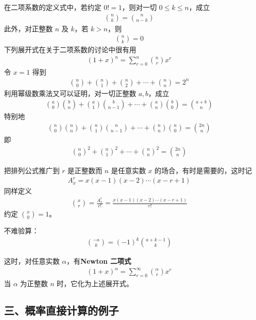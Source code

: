 \documentclass[../../main.tex]{subfiles}
\begin{document}
在二项系数的定义式中，若约定 $0!=1$，则对一切 $0\leqslant k\leqslant n$，成立
\begin{align*}
\binom{n}{k}=\binom{n}{n-k}
\end{align*}
此外，对正整数 $n$ 及 $k$，若 $k>n$，则
\begin{align*}
\binom{n}{k}=0
\end{align*}
下列展开式在关于二项系数的讨论中很有用
\begin{align*}
(1+x)^n=\sum_{r=0}^{n}\binom{n}{r}x^r
\end{align*}
令 $x=1$ 得到
\begin{align*}
\binom{n}{0}+\binom{n}{1}+\binom{n}{2}+\cdots+\binom{n}{n}=2^n
\end{align*}
利用幂级数乘法又可以证明，对一切正整数 $a,b$，成立
\begin{align}
\binom{a}{0}\binom{b}{n}+\binom{a}{1}\binom{b}{n-1}+\cdots+\binom{a}{n}\binom{b}{0}=\binom{a+b}{n}\label{align:ch01-范德蒙德}
\end{align}
特别地
\begin{align*}
\binom{n}{0}\binom{n}{n}+\binom{n}{1}\binom{n}{n-1}+\cdots+\binom{n}{n}\binom{n}{0}=\binom{2n}{n}
\end{align*}
即
\begin{align}
\binom{n}{0}^2+\binom{n}{1}^2+\cdots+\binom{n}{n}^2=\binom{2n}{n}\label{align:ch01-二项系数平方和}
\end{align}

把排列公式推广到 $r$ 是正整数而 $n$ 是任意实数 $x$ 的场合，有时是需要的，这时记
\begin{align*}
A_x^r=x(x-1)(x-2)\cdots(x-r+1)
\end{align*}
同样定义
\begin{align*}
\binom{x}{r}=\frac{A_x^r}{r!}=\frac{x(x-1)(x-2)\cdots(x-r+1)}{r!}
\end{align*}
约定 $\binom{x}{0}=1$。

不难验算：
\begin{align}
\binom{-a}{k}=(-1)^k\binom{a+k-1}{k}\label{align:ch01-负二项系数}
\end{align}

这时，对任意实数 $\alpha$，有\textbf{Newton 二项式}
\begin{align*}
(1+x)^\alpha=\sum_{r=0}^{\infty}\binom{\alpha}{r}x^r
\end{align*}
当 $\alpha$ 为正整数 $n$ 时，它化为上述展开式。

\subsection*{三、概率直接计算的例子}
\end{document}
